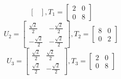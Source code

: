 \documentclass{article}
\begin{document}
\begin{itemize}
$$\begin{bmatrix}
        \end{bmatrix},T_1 = \begin{bmatrix}
            2 &0\\
            0 &8
        \end{bmatrix}$$
        $$U_2 = \begin{bmatrix}
            \frac{\sqrt{2}}{2} &-\frac{\sqrt{2}}{2}\\
            -\frac{\sqrt{2}}{2} &-\frac{\sqrt{2}}{2}
        \end{bmatrix},T_2 = \begin{bmatrix}
            8 &0\\
            0 &2
        \end{bmatrix}$$
        $$U_3 = \begin{bmatrix}
            \frac{\sqrt{2}}{2} &\frac{\sqrt{2}}{2}\\
            \frac{\sqrt{2}}{2} &-\frac{\sqrt{2}}{2}
        \end{bmatrix},T_3 = \begin{bmatrix}
            2 &0\\
            0 &8
        \end{bmatrix}$$
\end{itemize}
\end{document}
